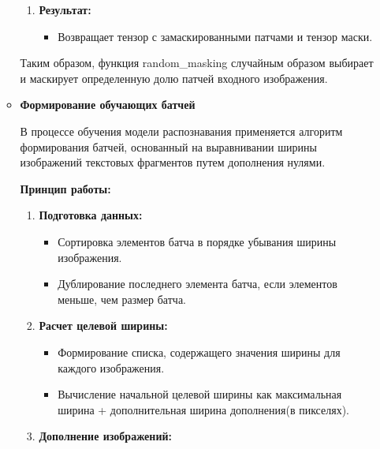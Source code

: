 \begin{itemize}
\begin{itemize}
\begin{enumerate}
                \item \textbf{Результат:}
                \begin{itemize}
                    \item Возвращает  тензор  с  замаскированными  патчами и тензор  маски.
                \end{itemize}
            \end{enumerate}
        
            Таким  образом,  функция  random\_masking  случайным  образом  выбирает  и  маскирует  определенную  долю  патчей  входного  изображения.

        
        \item  \textbf{Формирование обучающих батчей}
        
            В процессе обучения модели распознавания применяется алгоритм формирования батчей, основанный на выравнивании ширины изображений текстовых фрагментов путем дополнения нулями. 

            \textbf{Принцип работы:}
            
            \begin{enumerate}
                \item \textbf{Подготовка данных:}
                    \begin{itemize}
                        \item Сортировка элементов батча в порядке убывания ширины изображения.
                        \item Дублирование последнего элемента батча, если элементов меньше, чем размер батча.
                    \end{itemize}

                    \item \textbf{Расчет целевой ширины:}
                    
                    \begin{itemize}
                        \item Формирование списка, содержащего значения ширины для каждого изображения. 
                        \item Вычисление начальной целевой ширины как максимальная ширина + дополнительная ширина дополнения(в пикселях).
                    \end{itemize}
            
                \item \textbf{Дополнение изображений:}
                    

\end{enumerate}
\end{itemize}
\end{itemize}
